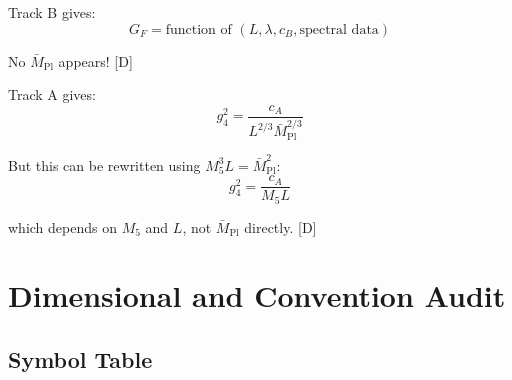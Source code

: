 \documentclass[11pt,a4paper]{article}
\newcommand{\tagD}{\textcolor{blue!70!black}{[D]}}
\begin{document}
Track B gives:
\begin{equation}
\label{eq:track-b-no-Mpl}
G_F = \text{function of } (L, \lambda, c_B, \text{spectral data})
\end{equation}

No $\bar{M}_{\text{Pl}}$ appears! \tagD

Track A gives:
\begin{equation}
\label{eq:track-a-with-Mpl}
g_4^2 = \frac{c_A}{L^{2/3} \bar{M}_{\text{Pl}}^{2/3}}
\end{equation}

But this can be rewritten using $M_5^3 L = \bar{M}_{\text{Pl}}^2$:
\begin{equation}
\label{eq:track-a-no-Mpl}
g_4^2 = \frac{c_A}{M_5 L}
\end{equation}

which depends on $M_5$ and $L$, not $\bar{M}_{\text{Pl}}$ directly. \tagD

\section{Dimensional and Convention Audit}

\subsection{Symbol Table}
\end{document}
